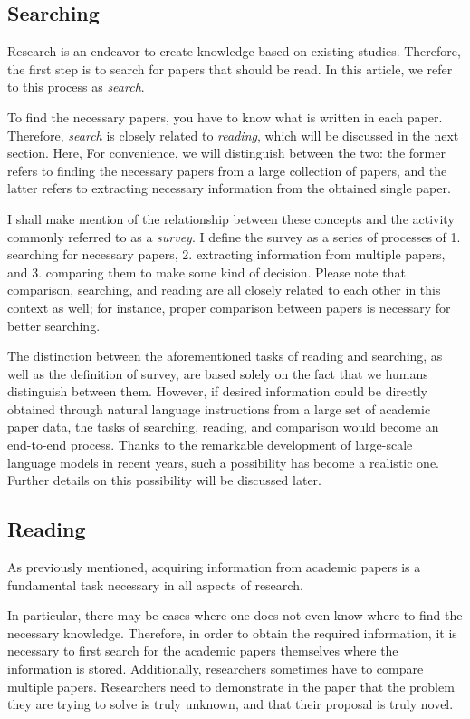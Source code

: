 \documentclass{book}
\begin{document}
\subsection{Searching}
Research is an endeavor to create knowledge based on existing studies. Therefore, the first step is to search for papers that should be read. In this article, we refer to this process as \textit{search}.

To find the necessary papers, you have to know what is written in each paper. Therefore, \textit{search} is closely related to \textit{reading}, which will be discussed in the next section. Here, For convenience, we will distinguish between the two: the former refers to finding the necessary papers from a large collection of papers, and the latter refers to extracting necessary information from the obtained single paper.

I shall make mention of the relationship between these concepts and the activity commonly referred to as a \textit{survey}. I define the survey as a series of processes of 1. searching for necessary papers, 2. extracting information from multiple papers, and 3. comparing them to make some kind of decision. Please note that comparison, searching, and reading are all closely related to each other in this context as well; for instance, proper comparison between papers is necessary for better searching.

The distinction between the aforementioned tasks of reading and searching, as well as the definition of survey, are based solely on the fact that we humans distinguish between them. However, if desired information could be directly obtained through natural language instructions from a large set of academic paper data, the tasks of searching, reading, and comparison would become an end-to-end process. Thanks to the remarkable development of large-scale language models in recent years, such a possibility has become a realistic one. Further details on this possibility will be discussed later.

\subsection{Reading}
As previously mentioned, acquiring information from academic papers is a fundamental task necessary in all aspects of research.

In particular, there may be cases where one does not even know where to find the necessary knowledge. Therefore, in order to obtain the required information, it is necessary to first search for the academic papers themselves where the information is stored. 
Additionally, researchers sometimes have to compare multiple papers. Researchers need to demonstrate in the paper that the problem they are trying to solve is truly unknown, and that their proposal is truly novel.
\end{document}
